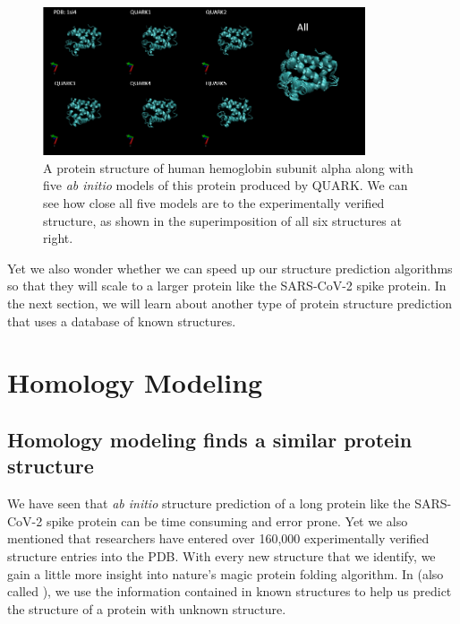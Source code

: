 \begin{figure}[h]
	\centering
	\mySfFamily
	\includegraphics[width = 0.85\textwidth]{../images/ab_initio_results.png}
	\caption{A protein structure of human hemoglobin subunit alpha along with five \textit{ab initio} models of this protein produced by QUARK. We can see how close all five models are to the experimentally verified structure, as shown in the superimposition of all six structures at right.}
	\label{fig:ab_initio_results}
\end{figure}

Yet we also wonder whether we can speed up our structure prediction algorithms so that they will scale to a larger protein like the SARS-CoV-2 spike protein. In the next section, we will learn about another type of protein structure prediction that uses a database of known structures.\\

\begin{qbox}\end{qbox}

\FloatBarrier
{}

\section{Homology Modeling}
\label{sec:homology}
\subsection{Homology modeling finds a similar protein structure}

We have seen that \textit{ab initio} structure prediction of a long protein like the SARS-CoV-2 spike protein can be time consuming and error prone. Yet we also mentioned that researchers have entered over 160,000 experimentally verified structure entries into the PDB. With every new structure that we identify, we gain a little more insight into nature's magic protein folding algorithm. In  (also called ), we use the information contained in known structures to help us predict the structure of a protein with unknown structure.

